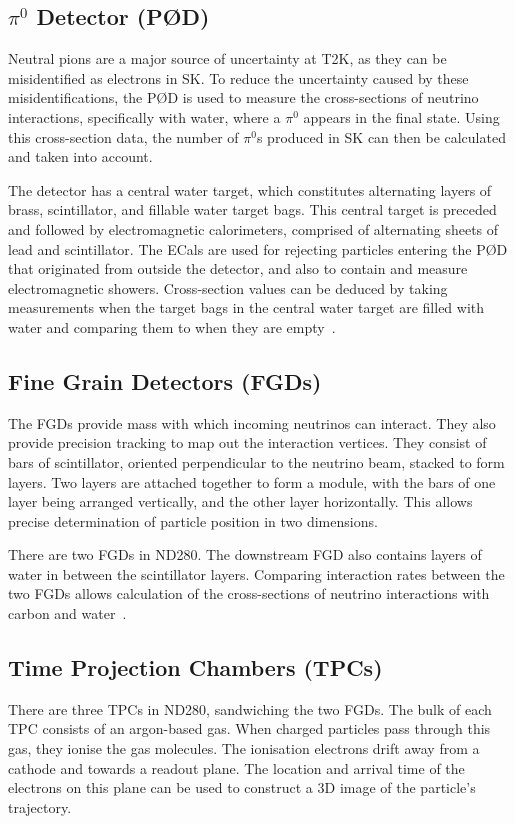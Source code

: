 \documentclass[aps,pra,12pt,notitlepage,tightenlines]{revtex4-1}
\begin{document}
\subsection{$\pi^0$ Detector (P\O D)}
Neutral pions are a major source of uncertainty at T2K, as they can be misidentified as electrons in SK. To reduce the uncertainty caused by these misidentifications, the P\O D is used to measure the cross-sections of neutrino interactions, specifically with water, where a $\pi^0$ appears in the final state. Using this cross-section data, the number of $\pi^0$s produced in SK can then be calculated and taken into account.

The detector has a central water target, which constitutes alternating layers of brass, scintillator, and fillable water target bags. This central target is preceded and followed by electromagnetic calorimeters, comprised of alternating sheets of lead and scintillator. The ECals are used for rejecting particles entering the P\O D that originated from outside the detector, and also to contain and measure electromagnetic showers. Cross-section values can be deduced by taking measurements when the target bags in the central water target are filled with water and comparing them to when they are empty~\cite{ABE2011106, Assylbekov:2011sh}.

\subsection{Fine Grain Detectors (FGDs)}
The FGDs provide mass with which incoming neutrinos can interact. They also provide precision tracking to map out the interaction vertices. They consist of bars of scintillator, oriented perpendicular to the neutrino beam, stacked to form layers. Two layers are attached together to form a module, with the bars of one layer being arranged vertically, and the other layer horizontally. This allows precise determination of particle position in two dimensions.

There are two FGDs in ND280. The downstream FGD also contains layers of water in between the scintillator layers. Comparing interaction rates between the two FGDs allows calculation of the cross-sections of neutrino interactions with carbon and water~\cite{ABE2011106, Amaudruz:2012agx}.

\subsection{Time Projection Chambers (TPCs)}
There are three TPCs in ND280, sandwiching the two FGDs. The bulk of each TPC consists of an argon-based gas. When charged particles pass through this gas, they ionise the gas molecules. The ionisation electrons drift away from a cathode and towards a readout plane. The location and arrival time of the electrons on this plane can be used to construct a 3D image of the particle's trajectory.
\end{document}
